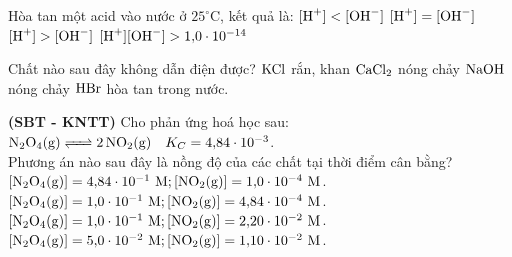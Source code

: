 \documentclass[12pt,a4paper]{article}
\begin{document}
\begin{ex}
Hòa tan một acid vào nước ở $25^\circ\text{C}$, kết quả là:
\choice
{$[\ce{H+}] < [\ce{OH-}]$}
{$[\ce{H+}] = [\ce{OH-}]$}
{\True $[\ce{H+}] > [\ce{OH-}]$}
{$[\ce{H+}][\ce{OH-}] > 1{,}0 \cdot 10^{-14}$}
\end{ex}

\begin{ex}
Chất nào sau đây không dẫn điện được?
\choice
{\True $\ce{KCl}$ rắn, khan}
{$\ce{CaCl2}$ nóng chảy}
{$\ce{NaOH}$ nóng chảy}
{$\ce{HBr}$ hòa tan trong nước.}
\end{ex}

\begin{ex}
\textbf{(SBT - KNTT)} Cho phản ứng hoá học sau: $\ce{N2O4(g) <=> 2NO2(g)} \quad K_C = 4{,}84 \cdot 10^{-3}$.\\
Phương án nào sau đây là nồng độ của các chất tại thời điểm cân bằng?
\choice
{$[\ce{N2O4(g)}] = 4{,}84 \cdot 10^{-1}\text{ M}; [\ce{NO2(g)}] = 1{,}0 \cdot 10^{-4}\text{ M}$.}
{$[\ce{N2O4(g)}] = 1{,}0 \cdot 10^{-1}\text{ M}; [\ce{NO2(g)}] = 4{,}84 \cdot 10^{-4}\text{ M}$.}
{\True $[\ce{N2O4(g)}] = 1{,}0 \cdot 10^{-1}\text{ M}; [\ce{NO2(g)}] = 2{,}20 \cdot 10^{-2}\text{ M}$.}
{$[\ce{N2O4(g)}] = 5{,}0 \cdot 10^{-2}\text{ M}; [\ce{NO2(g)}] = 1{,}10 \cdot 10^{-2}\text{ M}$.}
\end{ex}
\end{document}
